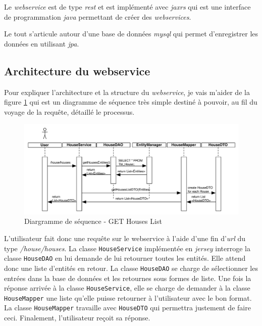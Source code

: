 \medskip

Le \emph{\gls{webservice}} est de type \emph{\gls{rest}} et est implémenté avec \emph{\gls{jaxrs}} qui est une interface de programmation \emph{\gls{java}} permettant de créer des \emph{\glspl{webservice}}.

\medskip

Le tout s'articule autour d'une base de données \emph{\gls{mysql}} qui permet d'enregistrer les données en utilisant \emph{\gls{jpa}}.

\subsection{Architecture du webservice} %
\label{sub:architecture_du_webservice}
Pour expliquer l'architecture et la structure du \emph{\gls{webservice}}, je vais m'aider de la figure \ref{gra:gethouselistsequence} qui est un diagramme de séquence très simple destiné à pouvoir, au fil du voyage de la requête, détaillé le processus. 

\begin{figure}[H]
      \centering
      \includegraphics[width=\textwidth]{00_media/04_SequenceGetHousesList.pdf}
      \caption{Diargramme de séquence - GET Houses List}
      \label{gra:gethouselistsequence}
\end{figure}

L'utilisateur fait donc une requête sur le webservice à l'aide d'une fin d'\emph{\gls{url}} du type \emph{/house/houses}. La classe \texttt{HouseService} implémentée en \emph{\gls{jersey}} interroge la classe \texttt{HouseDAO} en lui demande de lui retourner toutes les entités. Elle attend donc une liste d'entités en retour. La classe \texttt{HouseDAO} se charge de sélectionner les entrées dans la base de données et les retournes sous formes de liste. Une fois la réponse arrivée à la classe \texttt{HouseService}, elle se charge de demander à la classe \texttt{HouseMapper} une liste qu'elle puisse retourner à l'utilisateur avec le bon format. La classe \texttt{HouseMapper} travaille avec \texttt{HouseDTO} qui permettra justement de faire ceci. Finalement, l'utilisateur reçoit sa réponse.

